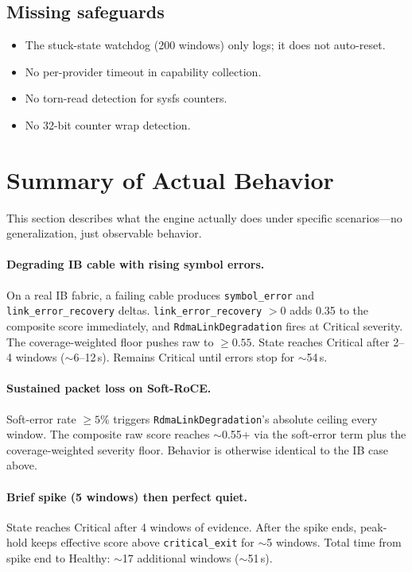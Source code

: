 \documentclass[11pt]{article}
\begin{document}
\subsection{Missing safeguards}

\begin{itemize}[nosep]
  \item The stuck-state watchdog (200 windows) only logs; it does not
        auto-reset.
  \item No per-provider timeout in capability collection.
  \item No torn-read detection for sysfs counters.
  \item No 32-bit counter wrap detection.
\end{itemize}


\section{Summary of Actual Behavior}
\label{sec:summary}

This section describes what the engine actually does under specific
scenarios---no generalization, just observable behavior.

\paragraph{Degrading IB cable with rising symbol errors.}
On a real IB fabric, a failing cable produces \texttt{symbol\_error} and
\texttt{link\_error\_recovery} deltas. \texttt{link\_error\_recovery} $> 0$
adds 0.35 to the composite score immediately, and
\texttt{RdmaLinkDegradation} fires at Critical severity. The
coverage-weighted floor pushes raw to $\geq 0.55$. State reaches Critical
after 2--4 windows ($\sim$6--12\,s). Remains Critical until errors stop
for $\sim$54\,s.

\paragraph{Sustained packet loss on Soft-RoCE.}
Soft-error rate $\geq 5$\% triggers \texttt{RdmaLinkDegradation}'s absolute
ceiling every window. The composite raw score reaches $\sim$0.55+ via the
soft-error term plus the coverage-weighted severity floor. Behavior is
otherwise identical to the IB case above.

\paragraph{Brief spike (5 windows) then perfect quiet.}
State reaches Critical after 4 windows of evidence. After the spike ends,
peak-hold keeps effective score above \texttt{critical\_exit} for $\sim$5
windows. Total time from spike end to Healthy: $\sim$17 additional windows
($\sim$51\,s).
\end{document}
